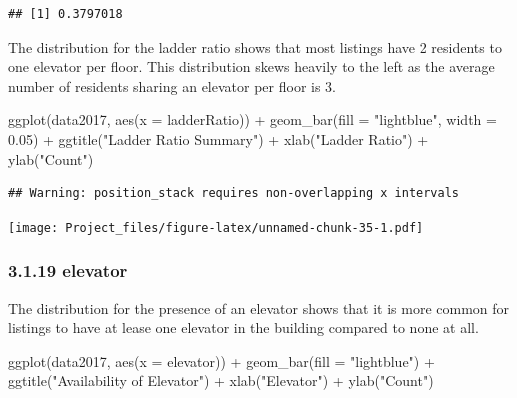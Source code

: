 \documentclass[
]{article}
\newenvironment{Shaded}{\begin{snugshade}}{\end{snugshade}}
\newcommand{\AttributeTok}[1]{\textcolor[rgb]{0.77,0.63,0.00}{#1}}
\newcommand{\FloatTok}[1]{\textcolor[rgb]{0.00,0.00,0.81}{#1}}
\newcommand{\FunctionTok}[1]{\textcolor[rgb]{0.00,0.00,0.00}{#1}}
\newcommand{\NormalTok}[1]{#1}
\newcommand{\SpecialCharTok}[1]{\textcolor[rgb]{0.00,0.00,0.00}{#1}}
\newcommand{\StringTok}[1]{\textcolor[rgb]{0.31,0.60,0.02}{#1}}
\begin{document}
\begin{verbatim}
## [1] 0.3797018
\end{verbatim}

The distribution for the ladder ratio shows that most listings have 2
residents to one elevator per floor. This distribution skews heavily to
the left as the average number of residents sharing an elevator per
floor is 3.

\begin{Shaded}
\begin{Highlighting}[]
\FunctionTok{ggplot}\NormalTok{(data2017, }\FunctionTok{aes}\NormalTok{(}\AttributeTok{x =}\NormalTok{ ladderRatio)) }\SpecialCharTok{+}
  \FunctionTok{geom\_bar}\NormalTok{(}\AttributeTok{fill =} \StringTok{"lightblue"}\NormalTok{, }\AttributeTok{width =} \FloatTok{0.05}\NormalTok{) }\SpecialCharTok{+}
  \FunctionTok{ggtitle}\NormalTok{(}\StringTok{"Ladder Ratio Summary"}\NormalTok{) }\SpecialCharTok{+}
  \FunctionTok{xlab}\NormalTok{(}\StringTok{"Ladder Ratio"}\NormalTok{) }\SpecialCharTok{+}
  \FunctionTok{ylab}\NormalTok{(}\StringTok{"Count"}\NormalTok{)}
\end{Highlighting}
\end{Shaded}

\begin{verbatim}
## Warning: position_stack requires non-overlapping x intervals
\end{verbatim}

\texttt{[image: Project\_files/figure-latex/unnamed-chunk-35-1.pdf]}

\hypertarget{elevator}{%
\subsubsection{3.1.19 elevator}\label{elevator}}

The distribution for the presence of an elevator shows that it is more
common for listings to have at lease one elevator in the building
compared to none at all.

\begin{Shaded}
\begin{Highlighting}[]
\FunctionTok{ggplot}\NormalTok{(data2017, }\FunctionTok{aes}\NormalTok{(}\AttributeTok{x =}\NormalTok{ elevator)) }\SpecialCharTok{+}
  \FunctionTok{geom\_bar}\NormalTok{(}\AttributeTok{fill =} \StringTok{"lightblue"}\NormalTok{) }\SpecialCharTok{+}
  \FunctionTok{ggtitle}\NormalTok{(}\StringTok{"Availability of Elevator"}\NormalTok{) }\SpecialCharTok{+}
  \FunctionTok{xlab}\NormalTok{(}\StringTok{"Elevator"}\NormalTok{) }\SpecialCharTok{+}
  \FunctionTok{ylab}\NormalTok{(}\StringTok{"Count"}\NormalTok{)}
\end{Highlighting}
\end{Shaded}
\end{document}
